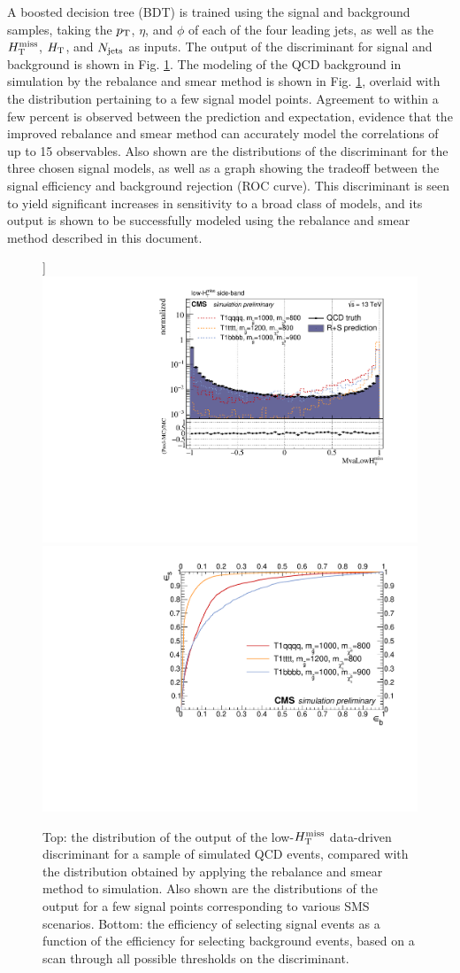 A boosted decision tree (BDT) \cite{Hocker:2007ht} is trained using the signal and background samples, taking the $p_{\text{T}}$, $\eta$, and $\phi$ of each of the four leading jets, as well as the $H_{\text{T}}^{\rm miss}$, $H_{\rm T}$, and $N_{\rm jets}$ as inputs. The output of the discriminant for signal and background is shown in Fig. \ref{fig:SusyBdt}. The modeling of the QCD background in simulation by the rebalance and smear method is shown in Fig. \ref{fig:SusyBdt}, overlaid with the distribution pertaining to a few signal model points. Agreement to within a few percent is observed between the prediction and expectation, evidence that the improved rebalance and smear method can accurately model the correlations of up to 15 observables. Also shown are the distributions of the discriminant for the three chosen signal models, as well as a graph showing the tradeoff between the signal efficiency and background rejection (ROC curve). This discriminant is seen to yield significant increases in sensitivity to a broad class of models, and its output is shown to be successfully modeled using the rebalance and smear method described in this document. 
\begin{figure}[[tb!]]
\centering
\includegraphics[width=0.7\linewidth]{figures/SusySearches/MvaSusy/MvaLowMht.pdf}
\includegraphics[width=0.7\linewidth]{figures/SusySearches/MvaSusy/RocCurvesLowMht_QCDVsSUSY.pdf}
\caption{Top: the distribution of the output of the low-$H_{\text{T}}^{\rm miss}$ data-driven discriminant for a sample of simulated QCD events, compared with the distribution obtained by applying the rebalance and smear method to simulation. Also shown are the distributions of the output for a few signal points corresponding to various SMS scenarios. Bottom: the efficiency of selecting signal events as a function of the efficiency for selecting background events, based on a scan through all possible thresholds on the discriminant.}
\label{fig:SusyBdt}
\end{figure}

